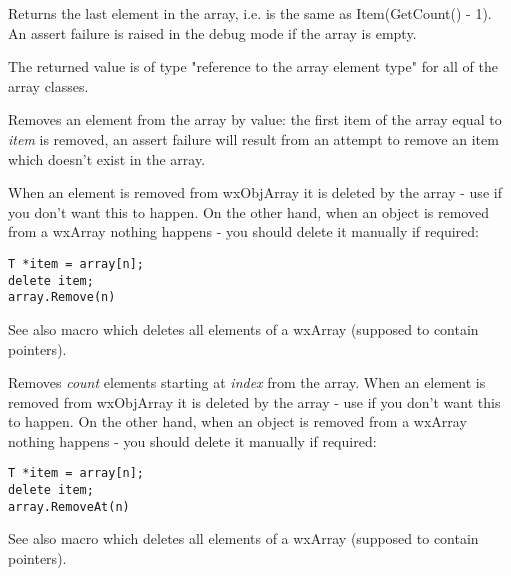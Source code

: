 
Returns the last element in the array, i.e. is the same as Item(GetCount() - 1).
An assert failure is raised in the debug mode if the array is empty.

The returned value is of type "reference to the array element type" for all of
the array classes.

\label{wxarrayremove}


Removes an element from the array by value: the first item of the
array equal to {\it item} is removed, an assert failure will result from an
attempt to remove an item which doesn't exist in the array.

When an element is removed from wxObjArray it is deleted by the array - use 
 if you don't want this to happen. On the
other hand, when an object is removed from a wxArray nothing happens - you
should delete it manually if required:

\begin{verbatim}
T *item = array[n];
delete item;
array.Remove(n)
\end{verbatim}

See also  macro which deletes all
elements of a wxArray (supposed to contain pointers).

\label{wxarrayremoveat}


Removes {\it count} elements starting at {\it index} from the array. When an
element is removed from wxObjArray it is deleted by the array - use
 if you don't want this to happen. On
the other hand, when an object is removed from a wxArray nothing happens -
you should delete it manually if required:

\begin{verbatim}
T *item = array[n];
delete item;
array.RemoveAt(n)
\end{verbatim}

See also  macro which deletes all
elements of a wxArray (supposed to contain pointers).

\label{wxarrayshrink}



